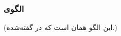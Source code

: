 \subsubsection{الگوی }
\label{archConStaticPriorSec}
\begin{RTL}
(این الگو همان  است که
در \cite{ref1} گفته‌شده.)
\end{RTL}